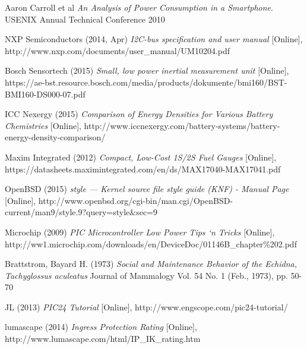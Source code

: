 \documentclass[12pt,openany,a4paper]{book}
\begin{document}
\begin{thebibliography}{99}
	Aaron Carroll et al \emph{An Analysis of Power Consumption in a Smartphone}.
	USENIX Annual Technical Conference 2010
	
	NXP Semiconductors (2014, Apr)
	\emph{I2C-bus specification and user manual} [Online],
	http://www.nxp.com/documents/user\_manual/UM10204.pdf
	
	Bosch Sensortech (2015)
	\emph{Small, low power inertial measurement unit} [Online], https://ae-bst.resource.bosch.com/media/products/dokumente/bmi160/BST-BMI160-DS000-07.pdf
	
	ICC Nexergy (2015)
	\emph{Comparison of Energy Densities for Various Battery Chemistries} [Online], http://www.iccnexergy.com/battery-systems/battery-energy-density-comparison/
	
	Maxim Integrated (2012)
	\emph{Compact, Low-Cost 1S/2S Fuel Gauges} [Online], https://datasheets.maximintegrated.com/en/ds/MAX17040-MAX17041.pdf
	
	OpenBSD (2015)
	\emph{style — Kernel source file style guide (KNF) - Manual Page} [Online], http://www.openbsd.org/cgi-bin/man.cgi/OpenBSD-current/man9/style.9?query=style\&sec=9
	
	Microchip (2009)
	\emph{PIC Microcontroller Low Power
		Tips ‘n Tricks} [Online], http://ww1.microchip.com/downloads/en/DeviceDoc/01146B\_chapter\%202.pdf
	
	Brattstrom, Bayard H. (1973)
	\emph{Social and Maintenance Behavior of the Echidna, Tachyglossus aculeatus}
	Journal of Mammalogy Vol. 54 No. 1 (Feb., 1973), pp. 50-70
	
	JL (2013)
	\emph{PIC24 Tutorial} [Online], http://www.engscope.com/pic24-tutorial/
	
	lumascape (2014)
	\emph{Ingress Protection Rating} [Online], http://www.lumascape.com/html/IP\_IK\_rating.htm
\end{thebibliography}
\end{document}
